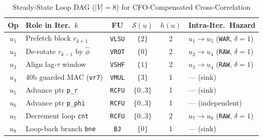 \documentclass[9pt,conference]{IEEEtran}
\begin{document}
\begin{table}[t]
\centering
\caption{Steady-State Loop DAG ($|V|=8$) for CFO-Compensated Cross-Correlation}
\label{tab:casestudy_dag}
\renewcommand{\arraystretch}{1.14}
\setlength{\tabcolsep}{2.8pt}
\scriptsize
\begin{tabular}{@{}clcccl@{}}
\toprule
\textbf{Op} & \textbf{Role in Iter.\ $k$} & \textbf{FU} & $\mathcal{S}(u)$ & $h(u)$ & \textbf{Intra-Iter.\ Hazard} \\
\midrule
$u_1$ & Prefetch block $r_{k+1}$ & \texttt{VLSU} & $\{2\}$ & 2 & $u_1 \to u_5$ (\texttt{WAR}, $\delta{=}1$) \\
$u_2$ & De-rotate $r_{k-1}$ by $\hat{\phi}$ & \texttt{VROT} & $\{0\}$ & 2 & $u_2 \to u_4$ (\texttt{RAW}, $\delta{=}1$) \\
$u_3$ & Align lag-$\tau$ window & \texttt{VSHF} & $\{1\}$ & 2 & $u_3 \to u_4$ (\texttt{RAW}, $\delta{=}1$) \\
$u_4$ & 40b guarded MAC (\texttt{vr7}) & \texttt{VMUL} & $\{3\}$ & 1 & --- (sink) \\
$u_5$ & Advance ptr \texttt{p\_r} & \texttt{RCFU} & $\{0..3\}$ & 1 & --- (sink) \\
$u_6$ & Advance ptr \texttt{p\_phi} & \texttt{RCFU} & $\{0..3\}$ & 1 & --- (independent) \\
$u_7$ & Decrement loop \texttt{cnt} & \texttt{RCFU} & $\{0..3\}$ & 2 & $u_7 \to u_8$ (\texttt{RAW}, $\delta{=}1$) \\
$u_8$ & Loop-back branch \texttt{bne} & \texttt{BJ} & $\{0\}$ & 1 & --- (sink) \\
\bottomrule
\end{tabular}
\end{table}
\end{document}

